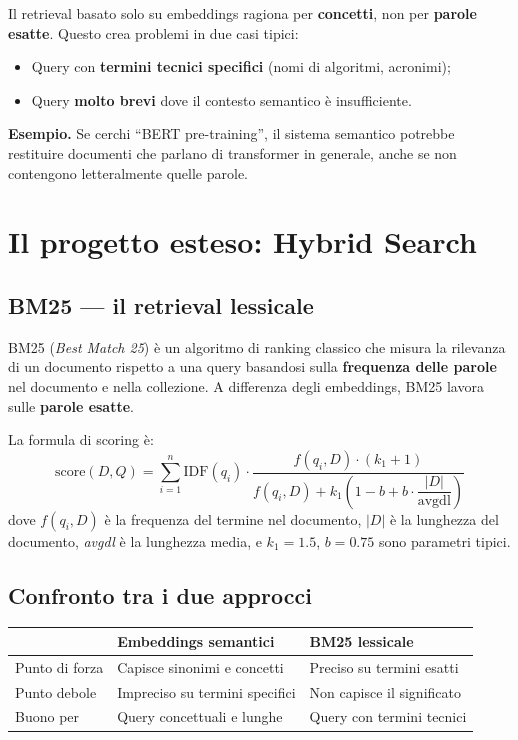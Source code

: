 \documentclass[12pt,a4paper]{article}
\begin{document}
Il retrieval basato solo su embeddings ragiona per \textbf{concetti}, non per
\textbf{parole esatte}. Questo crea problemi in due casi tipici:
\begin{itemize}
  \item Query con \textbf{termini tecnici specifici} (nomi di algoritmi, acronimi);
  \item Query \textbf{molto brevi} dove il contesto semantico è insufficiente.
\end{itemize}

\textbf{Esempio.} Se cerchi ``BERT pre-training'', il sistema semantico potrebbe
restituire documenti che parlano di transformer in generale, anche se non
contengono letteralmente quelle parole.

\section{Il progetto esteso: Hybrid Search}

\subsection{BM25 --- il retrieval lessicale}

BM25 (\textit{Best Match 25}) è un algoritmo di ranking classico che misura la
rilevanza di un documento rispetto a una query basandosi sulla
\textbf{frequenza delle parole} nel documento e nella collezione.
A differenza degli embeddings, BM25 lavora sulle \textbf{parole esatte}.

La formula di scoring è:
\[
  \text{score}(D,Q) = \sum_{i=1}^{n} \mathrm{IDF}(q_i)
  \cdot \frac{f(q_i,D)\cdot(k_1+1)}
             {f(q_i,D)+k_1\!\left(1-b+b\cdot\dfrac{|D|}{\mathrm{avgdl}}\right)}
\]
dove $f(q_i,D)$ è la frequenza del termine nel documento, $|D|$ è la lunghezza
del documento, \textit{avgdl} è la lunghezza media, e $k_1=1.5$, $b=0.75$ sono
parametri tipici.

\subsection{Confronto tra i due approcci}

\begin{center}
\begin{tabular}{lll}
\toprule
& \textbf{Embeddings semantici} & \textbf{BM25 lessicale} \\
\midrule
Punto di forza   & Capisce sinonimi e concetti    & Preciso su termini esatti \\
Punto debole     & Impreciso su termini specifici & Non capisce il significato \\
Buono per        & Query concettuali e lunghe     & Query con termini tecnici \\
\bottomrule
\end{tabular}
\end{center}
\end{document}
